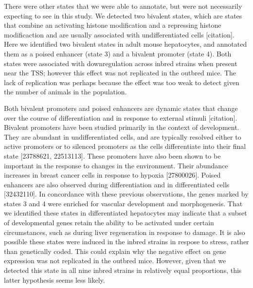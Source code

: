 \documentclass[10pt,letterpaper]{article}
\begin{document}
There were other states that we were able to annotate, but were not
necessarily expecting to see in this study. We detected two bivalent
states, which are states that combine an activating histone modification
and a repressing histone modificaction and are usually associated with
undifferentiated cells {[}citation{]}. Here we identified two bivalent
states in adult mouse hepatocytes, and annotated them as a poised
enhancer (state 3) and a bivalent promoter (state 4). Both states were
associated with downregulation across inbred strains when present near
the TSS; however this effect was not replicated in the outbred mice. The
lack of replication was perhaps because the effect was too weak to
detect given the number of animals in the population.

Both bivalent promoters and poised enhancers are dynamic states that
change over the course of differentiation and in response to external
stimuli {[}citation{]}. Bivalent promoters have been studied primarily
in the context of development. They are abundant in undifferentiated
cells, and are typically resolved either to active promoters or to
silenced promoters as the cells differentiate into their final state
{[}23788621, 22513113{]}. These promoters have also been shown to be
important in the response to changes in the environment. Their abundance
increases in breast cancer cells in response to hypoxia {[}27800026{]}.
Poised enhancers are also observed during differentiation and in
differentiated cells {[}32432110{]}. In concordance with these previous
observations, the genes marked by states 3 and 4 were enriched for
vascular development and morphogenesis. That we identified these states
in differentiated hepatocytes may indicate that a subset of
developmental genes retain the ability to be activated under certain
circumstances, such as during liver regeneration in response to damage.
It is also possible these states were induced in the inbred strains in
respose to stress, rather than genetically coded. This could explain why
the negative effect on gene expression was not replicated in the outbred
mice. However, given that we detected this state in all nine inbred
strains in relatively equal proportions, this latter hypothesis seems
less likely.
\end{document}
